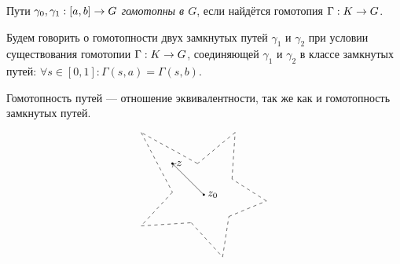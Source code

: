 \documentclass[a4paper]{report}
\begin{document}
    Пути $\gamma_0, \gamma_1: [a, b] \rightarrow G$ \emph{гомотопны в $G$}, если найдётся гомотопия $\Gamma: K \rightarrow G$.

    Будем говорить о гомотопности двух замкнутых путей $\gamma_1$ и $\gamma_2$ при условии существования гомотопии $\Gamma: K \rightarrow G$, соединяющей $\gamma_1$ и $\gamma_2$ в классе замкнутых путей: $\forall s \in [0, 1]: \Gamma(s, a) = \Gamma(s, b)$.

    Гомотопность путей --- отношение эквивалентности, так же как и гомотопность замкнутых путей.

%
%
    \[\begin{tikzpicture}
          \draw[dashed] (0.9, 0.5) -- (1, 2);
          \draw[dashed] (1, 2) -- (-0.2, 1);
          \draw[dashed] (-0.2, 1) -- (-2, 2);
          \draw[dashed] (-2, 2) -- (-1, 0.08);
          \draw[dashed] (-1, 0.08) -- (-2, -1);
          \draw[dashed] (-2, -1) -- (-0.4, -0.9);
          \draw[dashed] (-0.4, -0.9) -- (0.6, -2);
          \draw[dashed] (0.6, -2) -- (0.8, -0.7);
          \draw[dashed] (0.8, -0.7) -- (2, -0.2);
          \draw[dashed] (2, -0.2) -- (0.9, 0.5);
          \fill (0, 0) circle (1pt) node[right] {$z_0$};
          \fill (-1, 1) circle (1pt) node[right] {$z$};
          \draw[->] (0, 0) -- (-1, 1);
    \end{tikzpicture}\]
\end{document}
